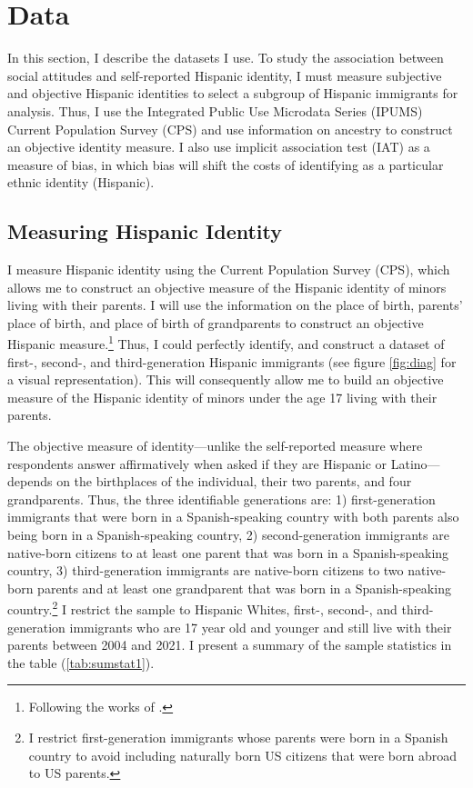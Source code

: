 \documentclass[12pt,english]{article}
\begin{document}
\section{Data}\label{sec:data}

In this section, I describe the datasets I use. To study the association between social attitudes and self-reported Hispanic identity, I must measure subjective and objective Hispanic identities to select a subgroup of Hispanic immigrants for analysis. Thus, I use the Integrated Public Use Microdata Series (IPUMS) Current Population Survey (CPS) \autocite{floodsarahIntegratedPublicUse2021a} and use information on ancestry to construct an objective identity measure. I also use implicit association test (IAT) as a measure of bias, in which bias will shift the costs of identifying as a particular ethnic identity (Hispanic).


\subsection{Measuring Hispanic Identity}\label{subsec:cps}

I measure Hispanic identity using the Current Population Survey (CPS), which allows me to construct an objective measure of the Hispanic identity of minors living with their parents. I will use the information on the place of birth, parents' place of birth, and place of birth of grandparents to construct an objective Hispanic measure.\footnote{Following the works of \textcite{antmanEthnicAttritionObserved2016,antmanEthnicAttritionAssimilation2020}.} Thus, I could perfectly identify, and construct a dataset of first-, second-, and third-generation Hispanic immigrants (see figure \ref{fig:diag} for a visual representation). This will consequently allow me to build an objective measure of the Hispanic identity of minors under the age 17 living with their parents. 

The objective measure of identity---unlike the self-reported measure where respondents answer affirmatively when asked if they are Hispanic or Latino---depends on the birthplaces of the individual, their two parents, and four grandparents. Thus, the three identifiable generations are: 1) first-generation immigrants that were born in a Spanish-speaking country with both parents also being born in a Spanish-speaking country, 2) second-generation immigrants are native-born citizens to at least one parent that was born in a Spanish-speaking country, 3) third-generation immigrants are native-born citizens to two native-born parents and at least one grandparent that was born in a Spanish-speaking country.\footnote{I restrict first-generation immigrants whose parents were born in a Spanish country to avoid including naturally born US citizens that were born abroad to US parents.} I restrict the sample to Hispanic Whites, first-, second-, and third-generation immigrants who are 17 year old and younger and still live with their parents between 2004 and 2021. I present a summary of the sample statistics in the table (\ref{tab:sumstat1}). 
\end{document}
